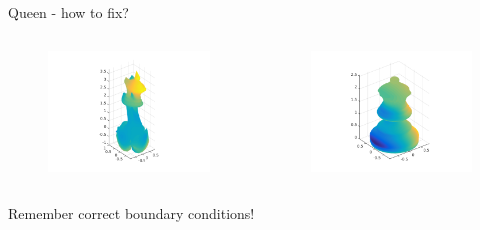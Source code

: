 \documentclass[screen]{beamer}
\begin{document}
\begin{frame}
Queen - how to fix?
\begin{columns}   
    \begin{column}{.5\linewidth}
        \begin{figure}
  		\includegraphics[scale=0.45]{figures/queen_broken}
  		\end{figure}
    \end{column}   
    \begin{column}{.5\linewidth}

        \begin{figure}
  		\includegraphics[scale=0.45]{figures/queen_fixed}
  		\end{figure}
    \end{column}
  \end{columns}
Remember correct boundary conditions!
\end{frame}
\end{document}
